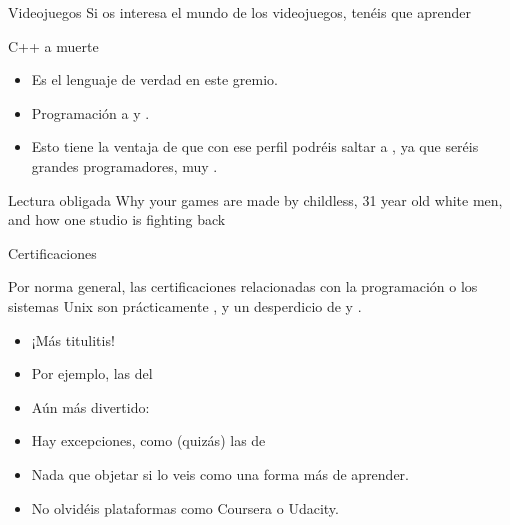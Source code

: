 \documentclass[14pt]{beamer}
\newcommand{\WebLink}[2]{
  \href{#1}{\structure{\PointingHand~\color{sail-green}{#2}}}
}
\begin{document}
\begin{frame}{Videojuegos}
  \centering \small
  Si os interesa el mundo de los videojuegos, tenéis que aprender

  \begin{alertblock}{}
    \centering \LARGE C++ a muerte
  \end{alertblock}

  \begin{itemize} \small
    \itemsep0em
    \item Es el lenguaje de verdad en este gremio.
    \item Programación a  y .
    \item Esto tiene la ventaja de que con ese perfil podréis saltar
      a , ya que seréis grandes
      programadores, muy .
  \end{itemize}

  \begin{block}{\centering \small Lectura obligada}
    \centering \small Why your games are made by childless, 31 year
    old white men, and how one studio is fighting back
    \WebLink{https://web.archive.org/web/20131211193933/http://penny-arcade.com/report/article/why-your-games-are-made-by-childless-31-year-old-white-men-and-how-one-stud}
            {Internet Archive}
  \end{block}
\end{frame}

\begin{frame}{Certificaciones}

  \begin{block}{}
    \centering
    Por norma general, las certificaciones relacionadas con la
    programación o los sistemas Unix son prácticamente
    , y un desperdicio de  y
    .
  \end{block}

  \begin{itemize}
    \item ¡Más titulitis!
    \item Por ejemplo, las del
      \WebLink{https://www.lpi.org/linux-certifications}
              {Linux Professional Institute}
    \item Aún más divertido:
      \WebLink{http://www.oreillyschool.com/certificate-programs/python-programming/}
              {Python Programming Certificate}
    \item Hay excepciones, como (quizás) las de
      \WebLink{http://cisco.com/web/learning/certifications/entry/ccent/index.html}
              {Cisco}
    \item Nada que objetar si lo veis como una forma más de aprender.
    \item No olvidéis plataformas como Coursera o Udacity.
  \end{itemize}

\end{frame}
\end{document}
